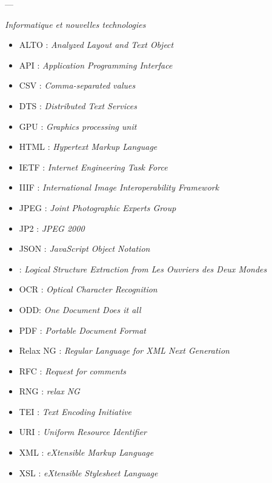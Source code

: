 \begin{center}---

\bigbreak

\textit{Informatique et nouvelles technologies}
\end{center} 

\bigbreak

\begin{itemize}
    \item ALTO : \textit{Analyzed Layout and Text Object}
    \item API : \textit{Application Programming Interface}
    \item CSV : \textit{Comma-separated values}
    \item DTS : \textit{Distributed Text Services}
    \item GPU : \textit{Graphics processing unit}
    \item HTML : \textit{Hypertext Markup Language}
    \item IETF : \textit{Internet Engineering Task Force}
    \item IIIF : \textit{International Image Interoperability Framework}
    \item JPEG : \textit{Joint Photographic Experts Group}
    \item JP2 : \textit{JPEG 2000}
    \item JSON : \textit{JavaScript Object Notation}
    \item \lse{} : \textit{Logical Structure Extraction from Les Ouvriers des Deux Mondes}
    \item OCR : \textit{Optical Character Recognition}
    \item ODD: \textit{One Document Does it all}
    \item PDF : \textit{Portable Document Format}
    \item Relax NG : \textit{Regular Language for XML Next Generation}
    \item RFC : \textit{Request for comments}
    \item RNG : \cf{} \textit{relax NG}
    \item TEI : \textit{Text Encoding Initiative}
    \item URI : \textit{Uniform Resource Identifier}
    \item XML : \textit{eXtensible Markup Language}
    \item XSL : \textit{eXtensible Stylesheet Language}
\end{itemize}

\clearpage
\thispagestyle{empty}